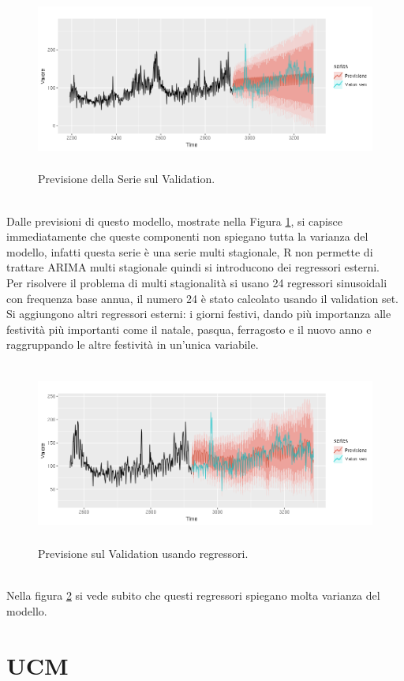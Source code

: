 \documentclass[12pt, onecolumn]{article}
\begin{document}
\begin{figure}[!h]
  \centering
  \includegraphics[width=\linewidth,height=6cm]{imgs/forecast_ar_1.png}
  \caption{Previsione della Serie sul Validation.}
  \label{fig:ARIMA_pred}
\end{figure}\\
Dalle previsioni di questo modello, mostrate nella Figura \ref{fig:ARIMA_pred}, si capisce immediatamente che queste componenti non spiegano tutta la varianza del modello, infatti questa serie è una serie multi stagionale, R non permette di trattare ARIMA multi stagionale quindi si introducono dei regressori esterni.\\
Per risolvere il problema di multi stagionalità si usano 24 regressori sinusoidali con frequenza base annua, il numero 24 è stato calcolato usando il validation set.
Si aggiungono altri regressori esterni: i giorni festivi, dando più importanza alle festività più importanti come il natale, pasqua, ferragosto e il nuovo anno e raggruppando le altre festività in un'unica variabile.
\begin{figure}[!h]
  \centering
  \includegraphics[width=\linewidth,height=6cm]{imgs/forecast_ar_2.png}
  \caption{Previsione sul Validation usando regressori.}
  \label{fig:XARIMA_pred}
\end{figure}\\
Nella figura \ref{fig:XARIMA_pred} si vede subito che questi regressori spiegano molta varianza del modello.

\section*{UCM}
\end{document}
